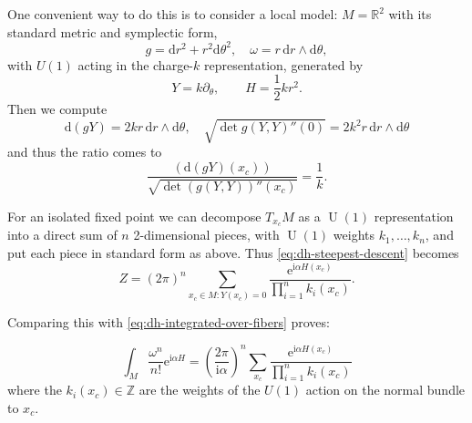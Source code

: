 \documentclass[12pt,letterpaper,reqno]{article}
\numberwithin{equation}{section}
\newcommand{\R}{\ensuremath{\mathbb R}}
\newcommand{\Z}{\ensuremath{\mathbb Z}}
\newcommand{\half}{\ensuremath{\frac{1}{2}}}
\newcommand{\I}{{\mathrm i}}
\newcommand{\e}{{\mathrm e}}
\newcommand{\de}{\mathrm{d}}
\newcommand{\abs}[1]{\lvert#1\rvert}
\DeclareMathOperator{\sgn}{sgn}
\DeclareMathOperator{\U}{U}
\begin{document}
One convenient way to do this is to consider a local model:
$M = \R^2$ with its standard metric and symplectic form,
\begin{equation}
g = \de r^2 + r^2 \de \theta^2, \quad \omega = r \, \de r \wedge \de \theta, 
\end{equation}
with $U(1)$ acting in the charge-$k$ representation,
generated by
\begin{equation}
  Y = k \partial_\theta, \qquad H = \half k r^2.
\end{equation}
Then we compute
\begin{equation}
  \de (gY) = 2 k r \, \de r \wedge \de \theta, \quad \sqrt{\det g(Y,Y)''(0)} = 2 k^2 r \, \de r \wedge \de \theta
\end{equation}
and thus the ratio comes to
\begin{equation}
  \frac{(\de(gY)(x_c))}{\sqrt{\det (g(Y,Y))''(x_c)}} = \frac{1}{k}.
\end{equation}

For an isolated fixed point we can decompose $T_{x_c} M$ as a $\U(1)$ representation
into a direct sum of $n$ 2-dimensional pieces, with $\U(1)$ 
weights $k_1, \dots, k_n$, and put each piece in standard form as
above.
Thus \eqref{eq:dh-steepest-descent} becomes
\begin{equation}
  Z = (2\pi)^n  \sum_{x_c \in M: Y(x_c) = 0} \frac{\e^{\I \alpha H(x_c)}}{\prod_{i=1}^n k_i(x_c)}.
\end{equation}

Comparing this with \eqref{eq:dh-integrated-over-fibers} proves:

\begin{thm} \label{thm:duistermaat-heckman}
\begin{equation} \label{eq:dh-formula}
\int_M \frac{\omega^n}{n!} \e^{\I \alpha H} = \left( \frac{2\pi}{\I \alpha} \right)^{n} \sum_{x_c} \frac{\e^{\I \alpha H(x_c)}}{\prod_{i=1}^n k_i(x_c)}
\end{equation}
where the $k_i(x_c) \in \Z$ are the weights of the $U(1)$ action
on the normal bundle to $x_c$.
\end{thm}
\end{document}
